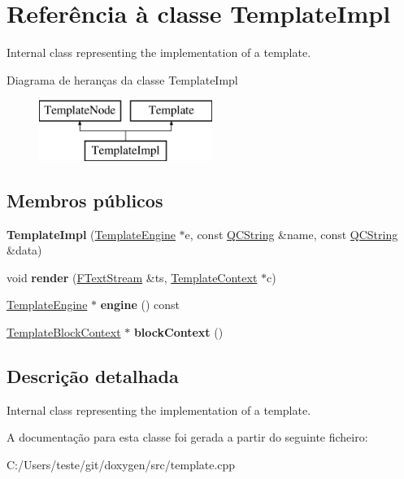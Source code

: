 \hypertarget{class_template_impl}{\section{Referência à classe Template\-Impl}
\label{class_template_impl}
}


Internal class representing the implementation of a template.  


Diagrama de heranças da classe Template\-Impl\begin{figure}[H]
\begin{center}
\leavevmode
\includegraphics[height=2.000000cm]{class_template_impl}
\end{center}
\end{figure}
\subsection*{Membros públicos}
\begin{DoxyCompactItemize}
\item 
\hypertarget{class_template_impl_aa160b877087d369c088ab6059e5cce2c}{{\bfseries Template\-Impl} (\hyperlink{class_template_engine}{Template\-Engine} $\ast$e, const \hyperlink{class_q_c_string}{Q\-C\-String} \&name, const \hyperlink{class_q_c_string}{Q\-C\-String} \&data)}\label{class_template_impl_aa160b877087d369c088ab6059e5cce2c}

\item 
\hypertarget{class_template_impl_aaa6575d8c79eeaa49f849f1ca1d6b228}{void {\bfseries render} (\hyperlink{class_f_text_stream}{F\-Text\-Stream} \&ts, \hyperlink{class_template_context}{Template\-Context} $\ast$c)}\label{class_template_impl_aaa6575d8c79eeaa49f849f1ca1d6b228}

\item 
\hypertarget{class_template_impl_a6f0e8ac97849a6899772f5c01876e3e7}{\hyperlink{class_template_engine}{Template\-Engine} $\ast$ {\bfseries engine} () const }\label{class_template_impl_a6f0e8ac97849a6899772f5c01876e3e7}

\item 
\hypertarget{class_template_impl_ae866eaa1d10725054fd3ee92053f734c}{\hyperlink{class_template_block_context}{Template\-Block\-Context} $\ast$ {\bfseries block\-Context} ()}\label{class_template_impl_ae866eaa1d10725054fd3ee92053f734c}

\end{DoxyCompactItemize}


\subsection{Descrição detalhada}
Internal class representing the implementation of a template. 

A documentação para esta classe foi gerada a partir do seguinte ficheiro\-:\begin{DoxyCompactItemize}
\item 
C\-:/\-Users/teste/git/doxygen/src/template.\-cpp\end{DoxyCompactItemize}
